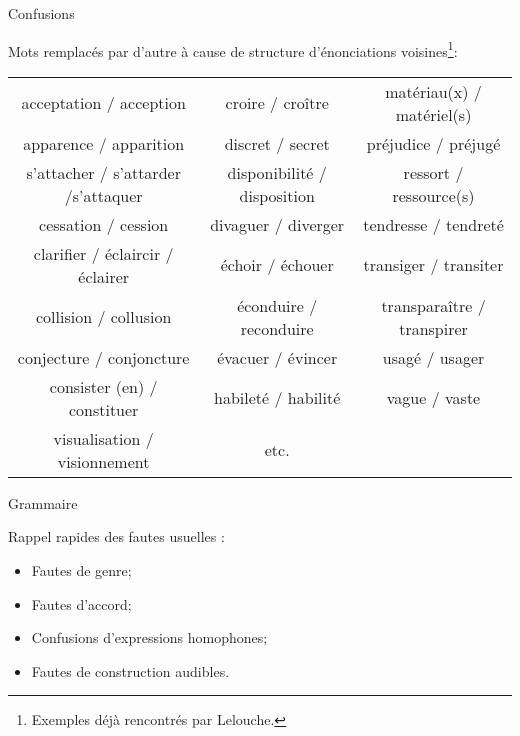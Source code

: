 \documentclass[french]{beamer}
\begin{document}
\begin{frame}{Confusions}

Mots remplacés par d'autre à cause de structure d'énonciations voisines\footnote{\scriptsize{Exemples déjà rencontrés par Lelouche.}}:
\begin{center}\tiny
	\begin{tabular}{ccc}
		acceptation / acception & croire / croître & matériau(x) / matériel(s) \\
		apparence / apparition & discret / secret & préjudice / préjugé \\
		s'attacher / s'attarder /s'attaquer & disponibilité / disposition & ressort / ressource(s) \\
		cessation / cession & divaguer / diverger & tendresse / tendreté \\
		clarifier / éclaircir / éclairer & échoir / échouer & transiger / transiter \\
		collision / collusion & éconduire / reconduire & transparaître / transpirer \\
		conjecture / conjoncture & évacuer / évincer & usagé / usager \\
		consister (en) / constituer & habileté / habilité & vague / vaste \\
		visualisation / visionnement & etc. & \\
	\end{tabular} 
\end{center}
\end{frame}

\begin{frame}{Grammaire}

Rappel rapides des fautes usuelles :
\begin{itemize}
	\item Fautes de genre;
	\item Fautes d'accord;
	\item Confusions d'expressions homophones;
	\item Fautes de construction audibles.
\end{itemize}
\end{frame}
\end{document}
